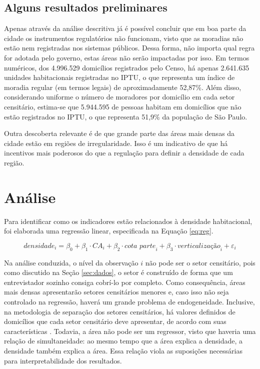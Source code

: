 \clearpage

\section*{Alguns resultados preliminares}

Apenas através da análise descritiva já é possível concluir que em boa parte da cidade os instrumentos regulatórios não funcionam, visto que as moradias não estão nem registradas nos sistemas públicos. Dessa forma, não importa qual regra for adotada pelo governo, estas áreas não serão impactadas por isso. Em termos numéricos, dos 4.996.529 domicílios registrados pelo Censo, há apenas 2.641.635 unidades habitacionais registradas no IPTU, o que representa um índice de moradia regular (em termos legais) de aproximadamente 52,87\%. Além disso, considerando uniforme o número de moradores por domicílio em cada setor censitário, estima-se que 5.944.595 de pessoas habitam em domicílios que não estão registrados no IPTU, o que representa 51,9\% da população de São Paulo.

Outra descoberta relevante é de que grande parte das áreas mais densas da cidade estão em regiões de irregularidade. Isso é um indicativo de que há incentivos mais poderosos do que a regulação para definir a densidade de cada região.



\chapter{Análise}
\label{sec:analise}

Para identificar como os indicadores estão relacionados à densidade habitacional, foi elaborada uma regressão linear, especificada na Equação \ref{eq:reg}. 

\begin{equation}
    \textit{densidade}_i = \beta_0 + \beta_1 \cdot \textit{CA}_i + \beta_2 \cdot\textit{cota parte}_i + \beta_3\cdot\textit{verticalização}_i + \varepsilon_i
    \label{eq:reg}
\end{equation}

Na análise conduzida, o nível da observação $i$ não pode ser o setor censitário, pois como discutido na Seção \ref{sec:dados}, o setor é construído de forma que um entrevistador sozinho consiga cobrí-lo por completo. Como consequência, áreas mais densas apresentarão setores censitários menores e, caso isso não seja controlado na regressão, haverá um grande problema de endogeneidade. Inclusive, na metodologia de separação dos setores censitários, há valores definidos de domicílios que cada setor censitário deve apresentar, de acordo com suas características \cite{IBGE2024}. Todavia, a área não pode ser um regressor, visto que haveria uma relação de simultaneidade: ao mesmo tempo que a área explica a densidade, a densidade também explica a área. Essa relação viola as suposições necessárias para interpretabilidade dos resultados.

